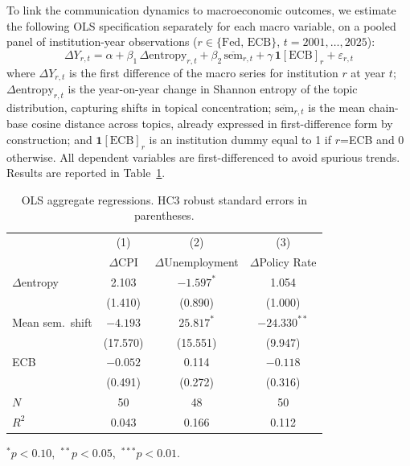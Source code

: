 To link the communication dynamics to macroeconomic outcomes, we estimate the following OLS specification separately for each macro variable, on a pooled panel of institution-year observations ($r \in \{\text{Fed, ECB}\}$, $t = 2001, \ldots, 2025$):
\begin{equation}
    \Delta Y_{r,t} = \alpha + \beta_1\,\Delta\text{entropy}_{r,t} + \beta_2\,\overline{\text{sem}}_{r,t} + \gamma\,\mathbf{1}[\text{ECB}]_r + \varepsilon_{r,t}
    \label{eq:ols_agg}
\end{equation}
where $\Delta Y_{r,t}$ is the first difference of the macro series for institution $r$ at year $t$; $\Delta\text{entropy}_{r,t}$ is the year-on-year change in Shannon entropy of the topic distribution, capturing shifts in topical concentration; $\overline{\text{sem}}_{r,t}$ is the mean chain-base cosine distance across topics, already expressed in first-difference form by construction; and $\mathbf{1}[\text{ECB}]_r$ is an institution dummy equal to 1 if $r$=ECB and 0 otherwise. All dependent variables are first-differenced to avoid spurious trends. Results are reported in Table~\ref{tab:ols_agg}.

\begin{table}[h!]
    \centering
    \caption{OLS aggregate regressions. HC3 robust standard errors in parentheses.}
    \label{tab:ols_agg}
    \begin{tabular}{lccc}
        \toprule
         & (1) & (2) & (3) \\
         & $\Delta$CPI & $\Delta$Unemployment & $\Delta$Policy Rate \\
        \midrule
        $\Delta$entropy      &  2.103   & $-1.597^{*}$  &  1.054   \\
                             & (1.410)  &  (0.890)      & (1.000)  \\[4pt]
        Mean sem.\ shift     & $-4.193$ &  $25.817^{*}$ & $-24.330^{**}$ \\
                             & (17.570) & (15.551)      &  (9.947) \\[4pt]
        ECB                  & $-0.052$ &   0.114       & $-0.118$ \\
                             &  (0.491) &  (0.272)      &  (0.316) \\
        \midrule
        $N$                  & 50       & 48            & 50       \\
        $R^2$                & 0.043    & 0.166         & 0.112    \\
        \bottomrule
    \end{tabular}
    \par\smallskip\footnotesize{$^{*}p<0.10$,\ $^{**}p<0.05$,\ $^{***}p<0.01$.}
\end{table}


